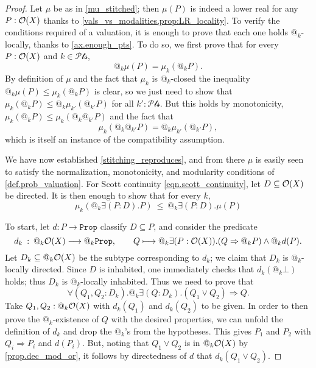 \documentclass[11pt, oneside, article]{memoir}
\makeatletter
\theoremstyle{plain}
\theoremstyle{definition}
\theoremstyle{remark}
\renewcommand{\ss}{\subseteq}
\newcommand{\const}[1]{\mathtt{#1}}
\newcommand{\prop}{\const{Prop}}
\newcommand{\Op}[1][undef]{\ifthenelse{\equal{#1}{undef}}{\mathcal{O}}{\mathcal{O}(#1)}}
\newcommand{\pt}{k}				%
\newcommand{\Pts}{\mathcal{Pts}}		%
\newcommand{\AtSymbol}{{@}}
\newcommand{\At}[1][\pt]{\AtSymbol_{#1}}
\newcommand{\imp}{\Rightarrow}
\makeatother
\begin{document}
\begin{proof}
	Let $\mu$ be as in \eqref{mu_stitched}; then $\mu(P)$ is indeed a lower real for any $P:\Op[X]$ thanks to \cref{vals_vs_modalities,prop:LR_locality}. To verify the conditions required of a valuation, it is enough to prove that each one holds $\At$-locally, thanks to \cref{ax.enough_pts}. To do so, we first prove that for every $P : \Op[X]$ and $\pt\in\Pts$,
	\begin{equation}
		\label{stitching_reproduces}
		\At \mu(P) = \mu_\pt(\At P).
	\end{equation}
	By definition of $\mu$ and the fact that $\mu_\pt$ is $\At$-closed the inequality $\At \mu(P) \le \mu_\pt(\At P)$ is clear, so we just need to show that $\mu_\pt(\At P) \le \At \mu_{\pt'}(\At[\pt'] P)$ for all $\pt' : \Pts$. But this holds by monotonicity, $\mu_\pt(\At P)\leq\mu_\pt(\At\At[\pt']P)$ and the fact that
	\[
		\mu_\pt(\At \At[\pt'] P) = \At \mu_{\pt'}(\At[\pt'] P),
	\]
	which is itself an instance of the compatibility assumption.

	We have now established \eqref{stitching_reproduces}, and from there $\mu$ is easily seen to satisfy the normalization, monotonicity, and modularity conditions of \cref{def.prob_valuation}. For Scott continuity \eqref{eqn.scott_continuity}, let $D \ss \Op[X]$ be directed. It is then enough to show that for every $\pt$,
	\begin{equation}
		\label{goal_continuous}
		\mu_\pt(\At \exists (P : D) . P) \: \le \: \At \exists (P : D). \mu(P)
	\end{equation}

To start, let $d\colon P\to\prop$ classify $D\ss P$, and consider the predicate
	\[
		d_\pt \: : \: \At \Op[X] \longrightarrow \At \prop, \qquad Q \longmapsto \At \exists (P : \Op[X]) . (Q \imp \At P) \land \At d(P).
	\]
	Let $D_\pt\ss\At\Op[X]$ be the subtype corresponding to $d_\pt$; we claim that $D_\pt$ is $\At$-locally directed. Since $D$ is inhabited, one immediately checks that $d_\pt(\At\bot)$ holds; thus $D_\pt$ is $\At$-locally inhabited. Thus we need to prove that
\[
		\forall(Q_1, Q_2 : D_\pt ) .\At \exists (Q : D_\pt) .(Q_1 \vee Q_2)  \imp Q.
\]
	Take $Q_1, Q_2 : \At \Op[X]$ with $d_\pt(Q_1)$ and $d_\pt(Q_2)$ to be given. In order to then prove the $\At$-existence of $Q$ with the desired properties, we can unfold the definition of $d_\pt$ and drop the $\At$'s from the hypotheses. This gives $P_1$ and $P_2$ with $Q_i \imp P_i$ and $d(P_i)$. But, noting that $Q_1\lor Q_2$ is in $\At\Op[X]$ by \cref{prop.dec_mod_or}, it follows by directedness of $d$ that $d_\pt(Q_1 \lor Q_2)$.


\end{proof}
\end{document}
